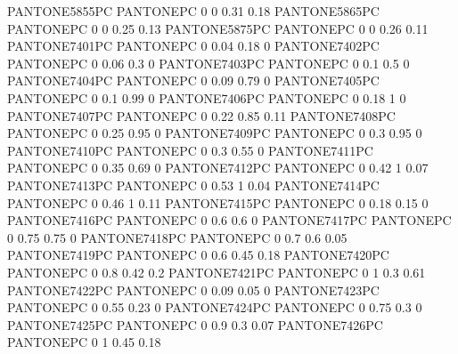  {PANTONE5855PC} {PANTONE\SpotSpace PC} {0 0 0.31 0.18}
 {PANTONE5865PC} {PANTONE\SpotSpace PC} {0 0 0.25 0.13}
 {PANTONE5875PC} {PANTONE\SpotSpace PC} {0 0 0.26 0.11}
 {PANTONE7401PC} {PANTONE\SpotSpace PC} {0 0.04 0.18 0}
 {PANTONE7402PC} {PANTONE\SpotSpace PC} {0 0.06 0.3 0}
 {PANTONE7403PC} {PANTONE\SpotSpace PC} {0 0.1 0.5 0}
 {PANTONE7404PC} {PANTONE\SpotSpace PC} {0 0.09 0.79 0}
 {PANTONE7405PC} {PANTONE\SpotSpace PC} {0 0.1 0.99 0}
 {PANTONE7406PC} {PANTONE\SpotSpace PC} {0 0.18 1 0}
 {PANTONE7407PC} {PANTONE\SpotSpace PC} {0 0.22 0.85 0.11}
 {PANTONE7408PC} {PANTONE\SpotSpace PC} {0 0.25 0.95 0}
 {PANTONE7409PC} {PANTONE\SpotSpace PC} {0 0.3 0.95 0}
 {PANTONE7410PC} {PANTONE\SpotSpace PC} {0 0.3 0.55 0}
 {PANTONE7411PC} {PANTONE\SpotSpace PC} {0 0.35 0.69 0}
 {PANTONE7412PC} {PANTONE\SpotSpace PC} {0 0.42 1 0.07}
 {PANTONE7413PC} {PANTONE\SpotSpace PC} {0 0.53 1 0.04}
 {PANTONE7414PC} {PANTONE\SpotSpace PC} {0 0.46 1 0.11}
 {PANTONE7415PC} {PANTONE\SpotSpace PC} {0 0.18 0.15 0}
 {PANTONE7416PC} {PANTONE\SpotSpace PC} {0 0.6 0.6 0}
 {PANTONE7417PC} {PANTONE\SpotSpace PC} {0 0.75 0.75 0}
 {PANTONE7418PC} {PANTONE\SpotSpace PC} {0 0.7 0.6 0.05}
 {PANTONE7419PC} {PANTONE\SpotSpace PC} {0 0.6 0.45 0.18}
 {PANTONE7420PC} {PANTONE\SpotSpace PC} {0 0.8 0.42 0.2}
 {PANTONE7421PC} {PANTONE\SpotSpace PC} {0 1 0.3 0.61}
 {PANTONE7422PC} {PANTONE\SpotSpace PC} {0 0.09 0.05 0}
 {PANTONE7423PC} {PANTONE\SpotSpace PC} {0 0.55 0.23 0}
 {PANTONE7424PC} {PANTONE\SpotSpace PC} {0 0.75 0.3 0}
 {PANTONE7425PC} {PANTONE\SpotSpace PC} {0 0.9 0.3 0.07}
 {PANTONE7426PC} {PANTONE\SpotSpace PC} {0 1 0.45 0.18}
